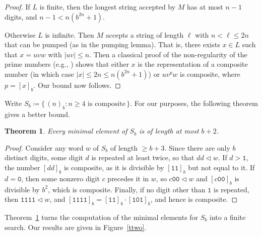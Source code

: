 \documentclass[12pt]{article}
\def\subw{\mathrel{\triangleleft}}
\theoremstyle{plain}
\newtheorem{theorem}{Theorem}
\theoremstyle{definition}
\newcommand{\0}{\mathtt{0}}
\newcommand{\1}{\mathtt{1}}
\newcommand{\2}{\mathtt{2}}
\newcommand{\3}{\mathtt{3}}
\newcommand{\4}{\mathtt{4}}
\newcommand{\5}{\mathtt{5}}
\newcommand{\6}{\mathtt{6}}
\newcommand{\7}{\mathtt{7}}
\newcommand{\8}{\mathtt{8}}
\newcommand{\9}{\mathtt{9}}
\newcommand{\set}[2]{\{\,#1{}:{}#2\,\}}
\begin{document}
\begin{proof}
If $L$ is finite, then the longest string accepted by $M$ has
at most $n-1$ digits, and $n-1 < n(b^{2n} + 1)$.

Otherwise $L$ is infinite.  Then $M$ accepts a string of length
$\ell$ with $n < \ell \leq 2n$ that can be pumped (as in the
pumping lemma).  That is, there exists $x \in L$ such that
$x = uvw$ with $|uv| \leq n$.  Then a classical proof of the
non-regularity of the prime numbers 
(e.g., \cite[Example 3.2, p.\ 57]{HU79})
shows that either $x$ is the representation of a composite 
number (in which case $|x| \leq 2n \leq n(b^{2n} + 1)$)
or $u v^p w$ is composite, where $p = [x]_b$.  
Our bound now follows.
\end{proof}

Write $S_b \coloneqq \set{(n)_b}{\text{$n \geq 4$ is composite}}$.
For our purposes, the following theorem gives a better bound.

\begin{theorem}
Every minimal element of $S_b$ is of length at most $b+2$.
\label{devi}
\end{theorem}

\begin{proof}
Consider any word $w$ of $S_b$ of length $\geq b+3$.   Since there are only
$b$ distinct digits, some digit $d$ is repeated at least twice,
so that $dd \subw w$.  If $d > \1$, the number $[dd]_b$ is composite,
as it is divisible by $[\1\1]_b$ but not equal to it.  If $d = \0$,
then some nonzero digit $c$ precedes it in $w$, so $c\0\0 \subw w$
and $[c\0\0]_b$ is divisible by $b^2$, which is composite.
Finally, if no digit other than $\1$ is repeated, then 
$\1\1\1\1 \subw w$, and $[\1\1\1\1]_b = [\1\1]_b \cdot [\1\0\1]_b$, and hence
is composite.
\end{proof}

Theorem~\ref{devi} turns the computation of the minimal elements for
$S_b$ into a finite search.  Our results are given in Figure~\ref{ttwo}.
\end{document}
